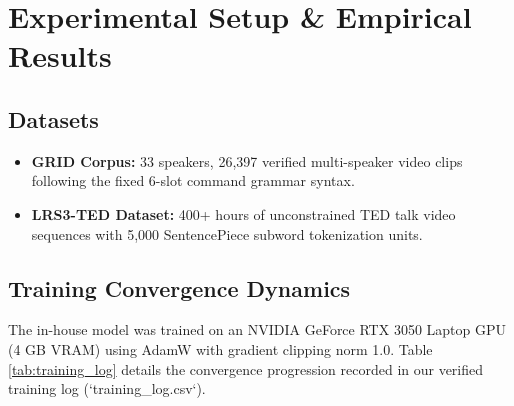 \documentclass[conference,compsoc,10pt]{IEEEtran}
\begin{document}
\section{Experimental Setup \& Empirical Results}

\subsection{Datasets}
\begin{itemize}
    \item \textbf{GRID Corpus:} 33 speakers, 26,397 verified multi-speaker video clips following the fixed 6-slot command grammar syntax.
    \item \textbf{LRS3-TED Dataset:} 400+ hours of unconstrained TED talk video sequences with 5,000 SentencePiece subword tokenization units.
\end{itemize}

\subsection{Training Convergence Dynamics}
The in-house model was trained on an NVIDIA GeForce RTX 3050 Laptop GPU (4 GB VRAM) using AdamW with gradient clipping norm 1.0. Table \ref{tab:training_log} details the convergence progression recorded in our verified training log (`training\_log.csv`).
\end{document}
